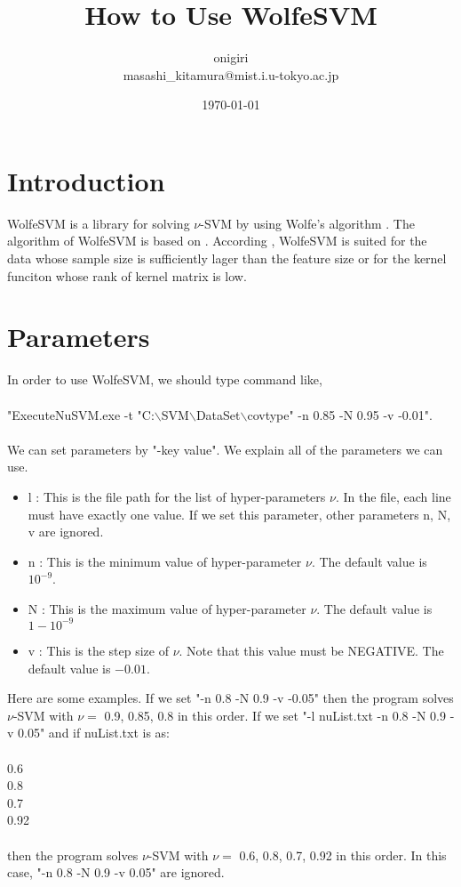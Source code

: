 \documentclass[11pt,a4paper]{article}
\title{How to Use WolfeSVM}
\author{onigiri \\ masashi\_kitamura@mist.i.u-tokyo.ac.jp}
\date{\today}
\begin{document}
\maketitle
%
%
\section{Introduction}
WolfeSVM is a library for solving $\nu$-SVM \cite{scholkopf} by using Wolfe's algorithm \cite{wolfe}.
The algorithm of WolfeSVM is based on \cite{mlsp}.
According \cite{mlsp},
WolfeSVM is suited for the data whose sample size is sufficiently lager than the feature size
or for the kernel funciton whose rank of kernel matrix is low.

\section{Parameters}
In order to use WolfeSVM, 
we should type command like, \\
\\
"ExecuteNuSVM.exe -t "C:$\backslash$SVM$\backslash$DataSet$\backslash$covtype" -n 0.85 -N 0.95 -v -0.01". \\
\\
We can set parameters by "-key value".
We explain all of the parameters we can use.
\begin{itemize}
\item l : This is the file path for the list of hyper-parameters $\nu$.
In the file, each line must have exactly one value.
If we set this parameter, other parameters n, N, v are ignored.
\item n : This is the minimum value of hyper-parameter $\nu$. The default value is $10^{-9}$.
\item N : This is the maximum value of hyper-parameter $\nu$. The default value is $1-10^{-9}$
\item v : This is the step size of $\nu$. Note that this value must be NEGATIVE. The default value is $-0.01$.
\end{itemize}
Here are some examples.
If we set "-n 0.8 -N 0.9 -v -0.05"
then the program solves $\nu$-SVM with $\nu = $ 0.9, 0.85, 0.8 in this order.
If we set "-l nuList.txt -n 0.8 -N 0.9 -v 0.05" and if nuList.txt is as: \\
\\
0.6\\
0.8\\
0.7\\
0.92\\
\\
then the program solves $\nu$-SVM with $\nu = $ 0.6, 0.8, 0.7, 0.92 in this order.
In this case, "-n 0.8 -N 0.9 -v 0.05" are ignored.
\end{document}

